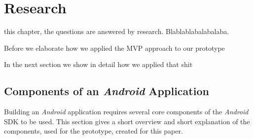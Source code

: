 %



\section{Research}
\label{sec:research}


 this chapter, the questions are answered by research. Blablablabalabalaba.


Before we elaborate how we applied the MVP approach to our prototype

In the next section we show in detail how we applied that shit


\subsection{Components of an \emph{Android} Application}

Building an \emph{Android} application requires several core components of the \emph{Android} SDK to be used. This section gives a short overview and short explanation of the components, used for the prototype, created for this paper.

